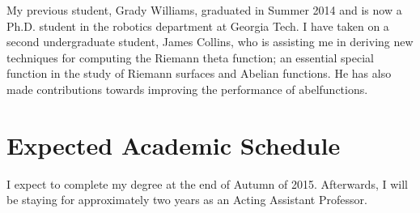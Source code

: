 \documentclass[12pt]{amsart}
\begin{document}
My previous student, Grady Williams, graduated in Summer 2014 and is now a
Ph.D. student in the robotics department at Georgia Tech. I have taken on a
second undergraduate student, James Collins, who is assisting me in deriving
new techniques for computing the Riemann theta function; an essential special
function in the study of Riemann surfaces and Abelian functions. He has also
made contributions towards improving the performance of {\sc abelfunctions}.

\section*{Expected Academic Schedule}

I expect to complete my degree at the end of Autumn of 2015. Afterwards, I will
be staying for approximately two years as an Acting Assistant Professor.
\end{document}
